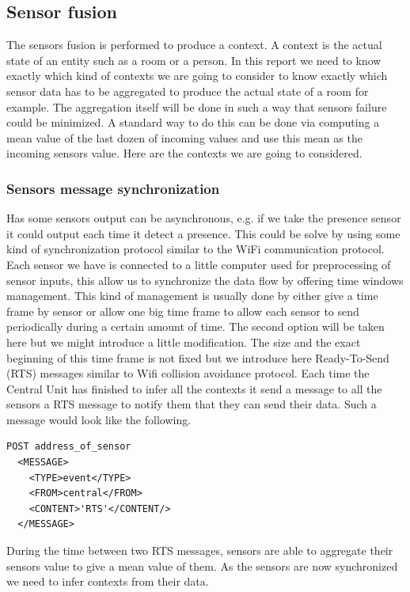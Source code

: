 \documentclass{acm_proc_article-sp}
\begin{document}
\subsection{Sensor fusion}
The sensors fusion is performed to produce a context. A context is the actual state of an entity such as a room or a person. 
In this report we need to know exactly which kind of contexts we are going to consider to know exactly which sensor data has to be aggregated to produce the actual state of a room for example. 
The aggregation itself will be done in such a way that sensors failure could be minimized.
A standard way to do this can be done via computing a mean value of the last dozen of incoming values and use this mean as the incoming sensors value.
Here are the contexts we are going to considered.
\subsubsection{Sensors message synchronization}
Has some sensors output can be asynchronous, e.g. if we take the presence sensor it could output each time it detect a presence.
This could be solve by using some kind of synchronization protocol similar to the WiFi communication protocol.
Each sensor we have is connected to a little computer used for preprocessing of sensor inputs, this allow us to synchronize the data flow by offering time windows management.
This kind of management is usually done by either give a time frame by sensor or allow one big time frame to allow each sensor to send periodically during a certain amount of time.
The second option will be taken here but we might introduce a little modification. 
The size and the exact beginning of this time frame is not fixed but we introduce here Ready-To-Send (RTS) messages similar to Wifi collision avoidance protocol.
Each time the Central Unit has finished to infer all the contexts it send a message to all the sensors a RTS message to notify them that they can send their data.
Such a message would look like the following.
\begin{verbatim}
POST address_of_sensor 
  <MESSAGE>
    <TYPE>event</TYPE>
    <FROM>central</FROM>
    <CONTENT>'RTS'</CONTENT/>
  </MESSAGE> 
\end{verbatim}
During the time between two RTS messages, sensors are able to aggregate their sensors value to give a mean value of them.
As the sensors are now synchronized we need to infer contexts from their data.
\end{document}
